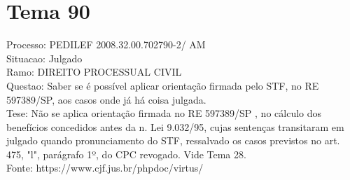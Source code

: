 \documentclass[12pt]{article}
\begin{document}
\section*{Tema 90}
Processo: PEDILEF 2008.32.00.702790-2/ AM\\
Situacao: Julgado\\
Ramo: DIREITO PROCESSUAL CIVIL\\
Questao: Saber se é possível aplicar orientação firmada pelo STF, no RE 597389/SP, aos casos onde já há coisa julgada.\\
Tese: Não se aplica orientação firmada no RE 597389/SP , no cálculo dos benefícios concedidos antes da n. Lei 9.032/95, cujas sentenças transitaram em julgado quando pronunciamento do STF, ressalvado os casos previstos no art. 475, "l", parágrafo 1º, do CPC revogado. Vide Tema 28.\\
Fonte: https://www.cjf.jus.br/phpdoc/virtus/
\end{document}
